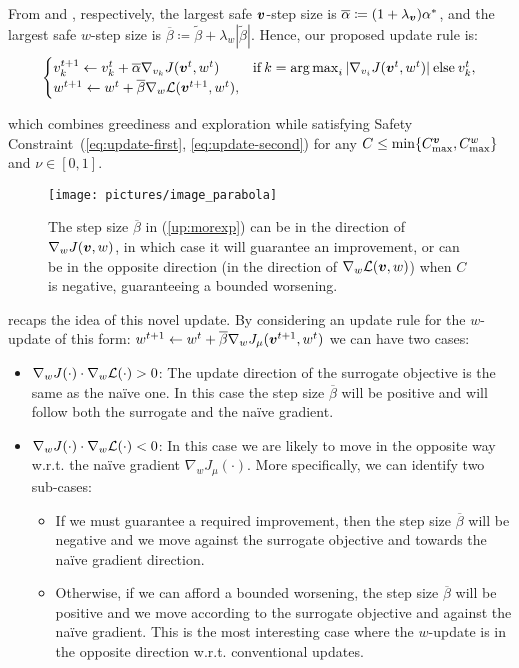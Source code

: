 From  and , respectively, the largest safe $\vv$-step size is $\overline{\alpha}\coloneqq(1+\lambda_{\vv})\alpha^*$, and the largest safe $w$-step size is $\overline{\beta}\coloneqq\tilde{\beta} + \lambda_{w}|\tilde{\beta}|$. Hence, our proposed update rule is:
%
\begin{align}\label{up:morexp}
\begin{cases}
v_{k}^{t+1} \gets v_{k}^t + \overline{\alpha}\gradJ[v_{k}]{\vv^t,w^t}
& \text{if}\:k =  \argmax_i |\gradJ[v_i]{\vv^t, w^t}| \:\text{else}\:v_{k}^t,\\
w^{t+1} \gets w^t + \overline{\beta}\gradDelta(\vv^{t+1}, w^t),
\end{cases}
\end{align}

which combines greediness and exploration while satisfying Safety Constraint~(\ref{eq:update-first}, \ref{eq:update-second}) for any ${C\leq\min\{C_{\text{max}}^{\vv},C_{\text{max}}^{w}\}}$ and $\nu\in[0,1]$. 

\begin{figure}
\texttt{[image: pictures/image\_parabola]}
\caption[Difference between $\nabla_w J(\cdot)$ and $\gradDelta(\cdot)$]{The step size $\overline{\beta}$ in (\ref{up:morexp}) can be in the direction of $\gradJ[w]{\vv, w}$, in which case it will guarantee an improvement, or can be in the opposite direction (in the direction of $\gradDelta(\vv, w)$) when $C$ is negative, guaranteeing a bounded worsening. }
\label{fig:boobs}
\end{figure}

 recaps the idea of this novel update. By considering an update rule for the $w$-update of this form: $w^{t+1} \gets w^t + \overline{\beta} \nabla_w J_\mu(\vv^{t+1}, w^t)$ we can have two cases:
\begin{itemize}
\item $\nabla_w J(\cdot) \cdot \nabla_w \Deltav(\cdot) > 0$: The update direction of the surrogate objective is the same as the na\"ive one. In this case the step size $\overline{\beta}$ will be positive and will follow both the surrogate and the na\"ive gradient.
\item $\nabla_w J(\cdot) \cdot \nabla_w \Deltav(\cdot) < 0$: In this case we are likely to move in the opposite way w.r.t. the na\"ive gradient $\nabla_w J_\mu(\cdot)$. More specifically, we can identify two sub-cases:
\begin{itemize}
\item If we must guarantee a required improvement, then the step size $\overline{\beta}$ will be negative and we move against the surrogate objective and towards the na\"ive gradient direction.
\item Otherwise, if we can afford a bounded worsening, the step size $\overline{\beta}$ will be positive and we move according to the surrogate objective and against the na\"ive gradient. This is the most interesting case where the $w$-update is in the opposite direction w.r.t. conventional updates.
\end{itemize}
\end{itemize}



